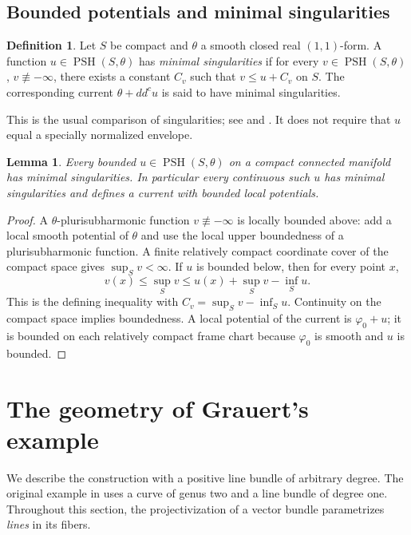 \documentclass[11pt,a4paper]{article}
\numberwithin{equation}{section}
\newtheorem{lemma}[theorem]{Lemma}
\theoremstyle{definition}
\newtheorem{definition}[theorem]{Definition}
\theoremstyle{remark}
\newcommand{\ddc}{dd^{c}}
\DeclareMathOperator{\PSH}{PSH}
\begin{document}
\subsection{Bounded potentials and minimal singularities}
\begin{definition}\label{pre:minimal-definition}
Let $S$ be compact and $\theta$ a smooth closed real $(1,1)$-form.
A function $u\in\PSH(S,\theta)$ has \emph{minimal singularities} if for
every $v\in\PSH(S,\theta)$, $v\not\equiv-\infty$, there exists a constant
$C_v$ such that $v\le u+C_v$ on $S$. The corresponding current
$\theta+\ddc u$ is said to have minimal singularities.
\end{definition}
This is the usual comparison of singularities; see
\cite[Definition~1.4 and Theorem~1.5]{DPS2001} and
\cite[\S1.4]{BEGZ2010}. It does not require that $u$ equal a specially
normalized envelope.

\begin{lemma}\label{pre:bounded-minimal}
Every bounded $u\in\PSH(S,\theta)$ on a compact connected manifold has
minimal singularities. In particular every continuous such $u$ has
minimal singularities and defines a current with bounded local potentials.
\end{lemma}
\begin{proof}
A $\theta$-plurisubharmonic function $v\not\equiv-\infty$ is locally
bounded above: add a local smooth potential of $\theta$ and use the local
upper boundedness of a plurisubharmonic function. A finite relatively
compact coordinate cover of the compact space gives $\sup_Sv<\infty$.
If $u$ is bounded below, then for every point $x$,
\[
 v(x)\le\sup_Sv
 \le u(x)+\sup_Sv-\inf_Su.
\]
This is the defining inequality with $C_v=\sup_Sv-\inf_Su$.
Continuity on the compact space implies boundedness. A local potential
of the current is $\varphi_0+u$; it is bounded on each relatively compact
frame chart because $\varphi_0$ is smooth and $u$ is bounded.
\end{proof}

\section{The geometry of Grauert's example}\label{geo:section}\label{sec:geometry}

We describe the construction with a positive line bundle of arbitrary
degree.  The original example in \cite[\S4, paragraph 8(d)]{Grauert1962}
uses a curve of genus two and a line bundle of degree one.  Throughout
this section, the projectivization of a vector bundle parametrizes
\emph{lines} in its fibers.
\end{document}
